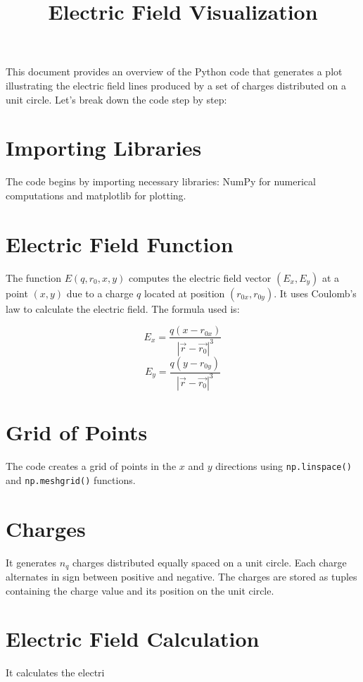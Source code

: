 \documentclass{article}
\title{Electric Field Visualization}
\author{}
\date{}
\begin{document}
\maketitle

This document provides an overview of the Python code that generates a plot illustrating the electric field lines produced by a set of charges distributed on a unit circle. Let's break down the code step by step:

\section{Importing Libraries}

The code begins by importing necessary libraries: NumPy for numerical computations and matplotlib for plotting.

\section{Electric Field Function}

The function $E(q, r_0, x, y)$ computes the electric field vector $(E_x, E_y)$ at a point $(x, y)$ due to a charge $q$ located at position $(r_{0x}, r_{0y})$. It uses Coulomb's law to calculate the electric field. The formula used is:

\[
E_x = \frac{q(x - r_{0x})}{|\vec{r} - \vec{r_0}|^3}
\]
\[
E_y = \frac{q(y - r_{0y})}{|\vec{r} - \vec{r_0}|^3}
\]

\section{Grid of Points}

The code creates a grid of points in the $x$ and $y$ directions using \texttt{np.linspace()} and \texttt{np.meshgrid()} functions.

\section{Charges}

It generates $n_q$ charges distributed equally spaced on a unit circle. Each charge alternates in sign between positive and negative. The charges are stored as tuples containing the charge value and its position on the unit circle.

\section{Electric Field Calculation}

It calculates the electri
\end{document}
